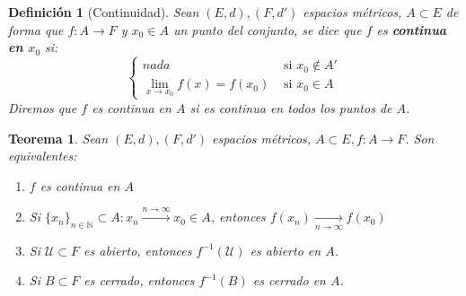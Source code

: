 \documentclass[10pt,a4paper,openright]{book}
\theoremstyle{break}
\newtheorem*{defi}{Definición}
\newtheorem*{theo}{Teorema}
\begin{document}
\begin{defi}[Continuidad]
Sean $(E,d),(F,d')$ espacios métricos, $A \subset E$ de forma que $f:A \to F$ y $x_0 \in A$ un punto del conjunto, se dice que $f$ es \textbf{continua en $x_0$} si:
$$\begin{cases} nada & \mbox{ si }x_0 \notin A' \\ \lim_{x \to x_0} f(x)=f(x_0) & \mbox{ si }x_0\in A \end{cases}$$
Diremos que $f$ es continua en $A$ si es continua en todos los puntos de $A$.   
\end{defi}

\begin{theo}
Sean $(E,d),(F,d')$ espacios métricos, $A \subset E, f:A \to F$. Son equivalentes:
\begin{enumerate}
\item $f$ es continua en $A$
\item Si $\{x_n\}_{n \in \mathbb{N}} \subset A : x_n \xrightarrow{n\rightarrow\infty} x_0 \in A$, entonces $f(x_n) \xrightarrow[n\rightarrow\infty]{} f(x_0)$
\item Si $\mathcal{U} \subset F$ es abierto, entonces $f^{-1}(\mathcal{U})$ es abierto en $A$.
\item Si $B\subset F$ es cerrado, entonces $f^{-1}(B)$ es cerrado en $A$.
\end{enumerate}
\end{theo}
\end{document}
